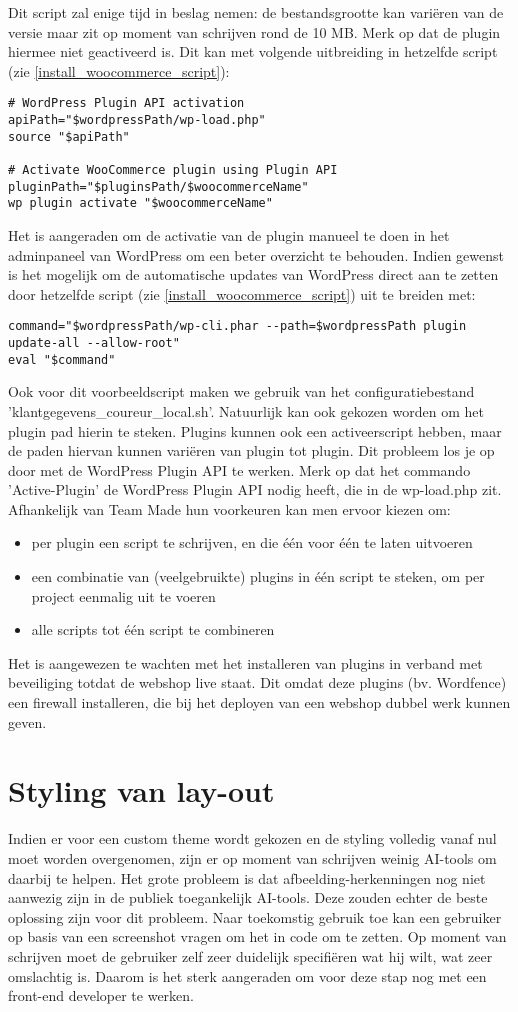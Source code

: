 Dit script zal enige tijd in beslag nemen: de bestandsgrootte kan variëren van de versie maar zit op moment van schrijven rond de 10 MB. Merk op dat de plugin hiermee niet geactiveerd is. Dit kan met volgende uitbreiding in hetzelfde script (zie \ref{install_woocommerce_script}):
\begin{verbatim}
# WordPress Plugin API activation
apiPath="$wordpressPath/wp-load.php"
source "$apiPath"

# Activate WooCommerce plugin using Plugin API
pluginPath="$pluginsPath/$woocommerceName"
wp plugin activate "$woocommerceName"    
\end{verbatim}
Het is aangeraden om de activatie van de plugin manueel te doen in het adminpaneel van WordPress om een beter overzicht te behouden. Indien gewenst is het mogelijk om de automatische updates van WordPress direct aan te zetten door hetzelfde script (zie \ref{install_woocommerce_script}) uit te breiden met:
\begin{verbatim}
command="$wordpressPath/wp-cli.phar --path=$wordpressPath plugin update-all --allow-root"
eval "$command"
\end{verbatim}
Ook voor dit voorbeeldscript maken we gebruik van het configuratiebestand 'klantgegevens\_coureur\_local.sh'. Natuurlijk kan ook gekozen worden om het plugin pad hierin te steken. Plugins kunnen ook een activeerscript hebben, maar de paden hiervan kunnen variëren van plugin tot plugin. Dit probleem los je op door met de WordPress Plugin API te werken. Merk op dat het commando 'Active-Plugin' de WordPress Plugin API nodig heeft, die in de wp-load.php zit. Afhankelijk van Team Made hun voorkeuren kan men ervoor kiezen om:
\begin{itemize}
    \item per plugin een script te schrijven, en die één voor één te laten uitvoeren
    \item een combinatie van (veelgebruikte) plugins in één script te steken, om per project eenmalig uit te voeren
    \item alle scripts tot één script te combineren
\end{itemize} 
Het is aangewezen te wachten met het installeren van plugins in verband met beveiliging totdat de webshop live staat. Dit omdat deze plugins (bv. Wordfence) een firewall installeren, die bij het deployen van een webshop dubbel werk kunnen geven.
\section{Styling van lay-out}
Indien er voor een custom theme wordt gekozen en de styling volledig vanaf nul moet worden overgenomen, zijn er op moment van schrijven weinig AI-tools om daarbij te helpen. Het grote probleem is dat afbeelding-herkenningen nog niet aanwezig zijn in de publiek toegankelijk AI-tools. Deze zouden echter de beste oplossing zijn voor dit probleem. Naar toekomstig gebruik toe kan een gebruiker op basis van een screenshot vragen om het in code om te zetten. Op moment van schrijven moet de gebruiker zelf zeer duidelijk specifiëren wat hij wilt, wat zeer omslachtig is. Daarom is het sterk aangeraden om voor deze stap nog met een front-end developer te werken.

